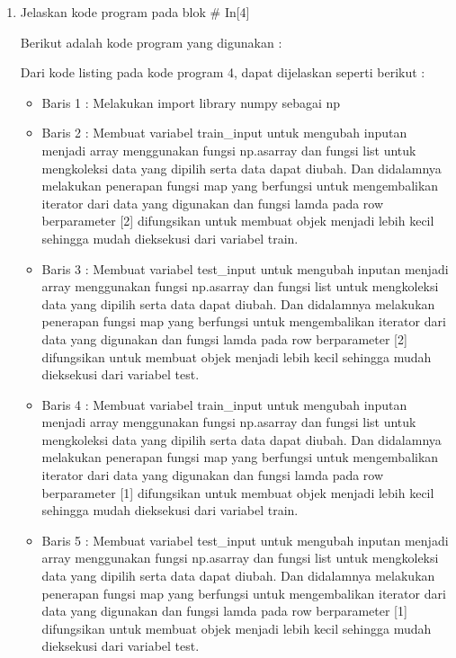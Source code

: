 \begin{enumerate}
\begin{itemize}
\end{itemize}
\par Sehingga dari kode program tersebut bila dijalankan, maka menghasilkan seperti pada gambar \ref{c7_10}.
\begin{figure}[!htbp]
	\centerline{\texttt{[image: figures/huda/chapter7/10.JPG]}}
	\caption{In[3]}
	\label{c7_10}
\end{figure}
\item Jelaskan kode program pada blok \# In[4]
\par Berikut adalah kode program yang digunakan :

\par Dari kode listing pada kode program 4, dapat dijelaskan seperti berikut :
\begin{itemize}
\item Baris 1	: Melakukan import library numpy sebagai np
\item Baris 2	: Membuat variabel train\_input untuk mengubah inputan menjadi array menggunakan fungsi np.asarray dan  fungsi list untuk mengkoleksi data yang dipilih serta data dapat diubah. Dan didalamnya melakukan penerapan fungsi map yang berfungsi untuk mengembalikan iterator dari data yang digunakan dan fungsi lamda pada row berparameter [2] difungsikan untuk membuat objek menjadi lebih kecil sehingga mudah dieksekusi dari variabel train.
\item Baris 3	: Membuat variabel test\_input untuk mengubah inputan menjadi array menggunakan fungsi np.asarray dan  fungsi list untuk mengkoleksi data yang dipilih serta data dapat diubah. Dan didalamnya melakukan penerapan fungsi map yang berfungsi untuk mengembalikan iterator dari data yang digunakan dan fungsi lamda pada row berparameter [2] difungsikan untuk membuat objek menjadi lebih kecil sehingga mudah dieksekusi dari variabel test.
\item Baris 4	: Membuat variabel train\_input untuk mengubah inputan menjadi array menggunakan fungsi np.asarray dan  fungsi list untuk mengkoleksi data yang dipilih serta data dapat diubah. Dan didalamnya melakukan penerapan fungsi map yang berfungsi untuk mengembalikan iterator dari data yang digunakan dan fungsi lamda pada row berparameter [1] difungsikan untuk membuat objek menjadi lebih kecil sehingga mudah dieksekusi dari variabel train.
\item Baris 5	: Membuat variabel test\_input untuk mengubah inputan menjadi array menggunakan fungsi np.asarray dan  fungsi list untuk mengkoleksi data yang dipilih serta data dapat diubah. Dan didalamnya melakukan penerapan fungsi map yang berfungsi untuk mengembalikan iterator dari data yang digunakan dan fungsi lamda pada row berparameter [1] difungsikan untuk membuat objek menjadi lebih kecil sehingga mudah dieksekusi dari variabel test.

\end{itemize}
\end{enumerate}
